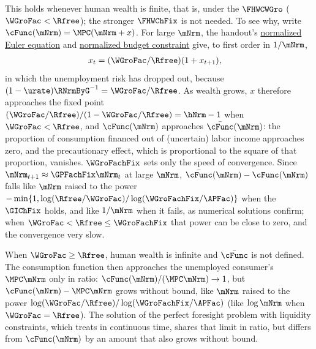 \documentclass{econark}
\begin{document}
This holds whenever human wealth is finite, that is, under the $\FHWCWGro$ ($\WGroFac < \Rfree$); the stronger $\FHWChFix$ is not needed.  To see why, write $\cFunc(\mNrm) = \MPC(\mNrm+x)$.  For large $\mNrm$, the handout's \hyperref[eq:BeforePFStep]{normalized Euler equation} and \hyperref[eq:metp1]{normalized budget constraint} give, to first order in $1/\mNrm$,
\begin{equation}\begin{gathered}\begin{aligned}
  x_{t} & = (\WGroFac/\Rfree)(1+x_{t+1}) ,
\end{aligned}\end{gathered}\end{equation}
in which the unemployment risk has dropped out, because $(1-\urate)\RNrmByG^{-1} = \WGroFac/\Rfree$.  As wealth grows, $x$ therefore approaches the fixed point $(\WGroFac/\Rfree)/(1-\WGroFac/\Rfree) = \hNrm-1$ when $\WGroFac < \Rfree$, and $\cFunc(\mNrm)$ approaches $\bar{\cFunc}(\mNrm)$: the proportion of consumption financed out of (uncertain) labor income approaches zero, and the precautionary effect, which is proportional to the square of that proportion, vanishes.  $\WGroFachFix$ sets only the speed of convergence.  Since $\mNrm_{t+1} \approx \GPFachFix\mNrm_{t}$ at large $\mNrm$, $\bar{\cFunc}(\mNrm)-\cFunc(\mNrm)$ falls like $\mNrm$ raised to the power $-\min\{1, \log(\Rfree/\WGroFac)/\log(\WGroFachFix/\APFac)\}$ when the $\GIChFix$ holds, and like $1/\mNrm$ when it fails, as numerical solutions confirm; when $\WGroFac < \Rfree \leq \WGroFachFix$ that power can be close to zero, and the convergence very slow.

When $\WGroFac \geq \Rfree$, human wealth is infinite and $\bar{\cFunc}$ is not defined.  The consumption function then approaches the unemployed consumer's $\MPC\mNrm$ only in ratio: $\cFunc(\mNrm)/(\MPC\mNrm) \rightarrow 1$, but $\cFunc(\mNrm)-\MPC\mNrm$ grows without bound, like $\mNrm$ raised to the power $\log(\WGroFac/\Rfree)/\log(\WGroFachFix/\APFac)$ (like $\log \mNrm$ when $\WGroFac = \Rfree$).  The solution of the perfect foresight problem with liquidity constraints, which \cite{parkLiqConstrContinuous} treats in continuous time, shares that limit in ratio, but differs from $\cFunc(\mNrm)$ by an amount that also grows without bound.

\pagebreak


\end{document}
